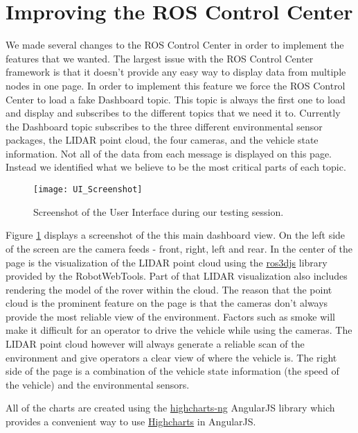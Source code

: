 \section{Improving the ROS Control Center}
We made several changes to the ROS Control Center in order to implement the features that we wanted.  The largest issue with the ROS Control Center framework is that it doesn't provide any easy way to display data from multiple nodes in one page.  In order to implement this feature we force the ROS Control Center to load a fake Dashboard topic.  This topic is always the first one to load and display and subscribes to the different topics that we need it to.  Currently the Dashboard topic subscribes to the three different environmental sensor packages, the LIDAR point cloud, the four cameras, and the vehicle state information.  Not all of the data from each message is displayed on this page.  Instead we identified what we believe to be the most critical parts of each topic.  

\begin{figure}[H]
\centerline{\texttt{[image: UI\_Screenshot]}}
\caption[]{Screenshot of the User Interface during our testing session.}
\label{fig:UI_Screenshot}
\end{figure}


Figure \ref{fig:UI_Screenshot} displays a screenshot of the this main dashboard view.  On the left side of the screen are the camera feeds - front, right, left and rear.  In the center of the page is the visualization of the LIDAR point cloud using the 
\href{https://github.com/RobotWebTools/ros3djs}{ros3djs} library provided by the RobotWebTools.  Part of that LIDAR visualization also includes rendering the model of the rover within the cloud.  The reason that the point cloud is the prominent feature on the page is that the cameras don't always provide the most reliable view of the environment.  Factors such as smoke will make it difficult for an operator to drive the vehicle while using the cameras.  The LIDAR point cloud however will always generate a reliable scan of the environment and give operators a clear view of where the vehicle is.  The right side of the page is a combination of the vehicle state information (the speed of the vehicle) and the environmental sensors.

All of the charts are created using the \href{https://github.com/pablojim/highcharts-ng}{highcharts-ng} AngularJS library which provides a convenient way to use \href{http://www.highcharts.com/}{Highcharts} in AngularJS.

